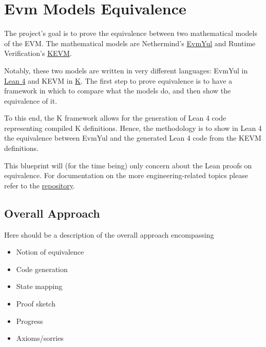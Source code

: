 \chapter*{Evm Models Equivalence}\label{evm-equiv-intro}

The project's goal is to prove the equivalence between two mathematical models of the EVM.
The mathematical models are Nethermind's \href{https://github.com/nethermindEth/EVMYulLean/}{EvmYul}
and Runtime Verification's \href{https://github.com/runtimeverification/evm-semantics}{KEVM}.

Notably, these two models are written in very different languages: EvmYul in
\href{https://lean-lang.org}{Lean 4} and KEVM in \href{https://kframework.org}{K}.
The first step to prove equivalence is to have a framework in which to compare
what the models do, and then show the equivalence of it.

To this end, the K framework allows for the generation of Lean 4 code
representing compiled K definitions.
Hence, the methodology is to show in Lean 4 the equivalence between EvmYul and
the generated Lean 4 code from the KEVM definitions.

This blueprint will (for the time being) only concern about the Lean proofs on
equivalence. For documentation on the more engineering-related topics please
refer to the
\href{https://github.com/runtimeverification/evm-equivalence}{repository}.

\section{Overall Approach}

Here should be a description of the overall approach encompassing
\begin{itemize}
\item Notion of equivalence
\item Code generation
\item State mapping
\item Proof sketch
\item Progress
\item Axioms/sorries
\end{itemize}

